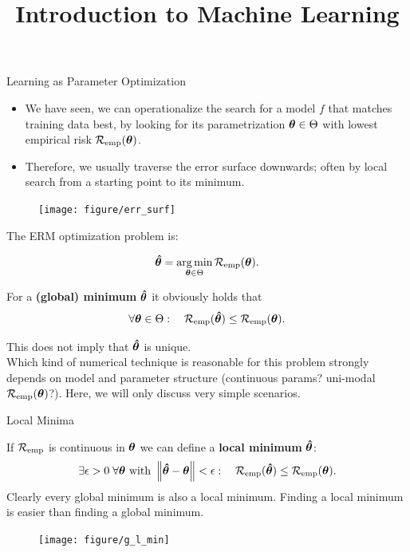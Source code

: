 \documentclass[11pt,compress,t,notes=noshow, xcolor=table]{beamer}
\title{Introduction to Machine Learning}
\begin{document}


\begin{vbframe}{Learning as Parameter Optimization}
\begin{itemize}
\item We have seen, we can operationalize the search for a model $f$ that matches
    training data best, by looking for its parametrization $\bm{\theta} \in \Theta$
    with lowest empirical risk $\mathcal{R}_{\text{emp}}(\bm{\theta})$.
\item Therefore, we usually traverse the error surface downwards; often by local search from a starting point to its minimum.
\end{itemize}
\begin{center}
\begin{figure}[!b]
\texttt{[image: figure/err\_surf]}
\end{figure}
\end{center}

\framebreak

The ERM optimization problem is:

\[
\bm{\hat\theta}  = \operatorname*{arg\,min}_{\bm{\theta} \in \Theta} \mathcal{R}_{\text{emp}}(\bm{\theta}) .
\]

For a \textbf{(global) minimum} $\bm{\hat\theta}$ it obviously holds that 
\[
\forall \bm{\theta} \in \Theta :\quad \mathcal{R}_{\text{emp}}(\bm{\hat\theta}) \leq \mathcal{R}_{\text{emp}}(\bm{\theta}) .
\]

This does not imply that $\bm{\hat\theta}$ is unique. \\
\lz
Which kind of numerical technique is reasonable for this problem strongly depends 
on model and parameter structure (continuous params? uni-modal $\mathcal{R}_{\text{emp}}(\bm{\theta})$?). 
Here, we will only discuss very simple scenarios.

\end{vbframe}
\begin{vbframe}{Local Minima}

If $\mathcal{R}_{\text{emp}}$ is continuous in $\bm{\theta}$ we can define a \textbf{local minimum} $\bm{\hat\theta}$:
\[
\exists \epsilon > 0\; \forall \bm{\theta} \text{ with } \left\Vert\bm{\hat\theta} - \bm{\theta}\right\Vert < \epsilon: \quad \mathcal{R}_{\text{emp}}(\bm{\hat\theta}) \leq \mathcal{R}_{\text{emp}}(\bm{\theta}) .
\]
Clearly every global minimum is also a local minimum.
Finding a local minimum is easier than finding a global minimum.

\begin{center}
\begin{figure}[!b]
\texttt{[image: figure/g\_l\_min]}
\end{figure}
\end{center}

\end{vbframe}
\end{document}
